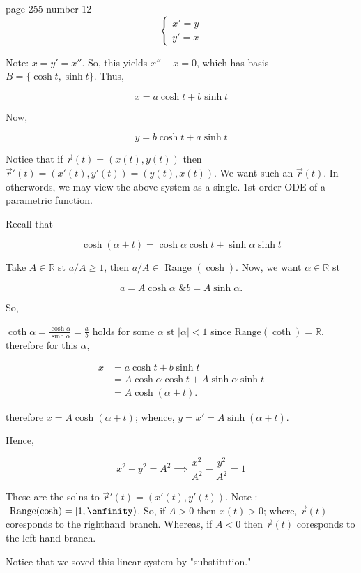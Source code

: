 \begin{example}
  page 255 number 12 \\ 
  
 \[ 
  \begin{cases}
   x' = y  \\
  y' = x 
  \end{cases}
  \]
  
  Note: \( x = y' = x'' \). So, this yields \( x'' - x = 0 \), which has
  basis \( B = \{ \cosh t, \sinh t \} \). Thus, 

  \[ x = a \cosh t + b \sinh t \]

  Now, 

  \[ y =  b \cosh t + a \sinh t\]

  Notice that if \( \vec{r}(t) = (x(t), y(t))  \) then \( \vec{r}'(t) =
  (x'(t), y'(t)) = (y(t), x(t))  \). We want such an \( \vec{r}(t)  \). In otherwords,
  we may view the above system as a single. 1st order ODE of a
  parametric function. 

  Recall that 

  \[ \cosh (\alpha + t) = \cosh \alpha \cosh t + \sinh \alpha \sinh t \]

  Take \( A \in \mathbb{R} \) st \( a/A \geq 1 \), then \( a/A \in \)
  Range \( (\cosh)\). Now, we want \( \alpha \in \mathbb{R} \) st

  \[ a = A \cosh \alpha \text{ \& }  b = A \sinh \alpha.\]

  So, 

  \( \coth \alpha = \frac{ \cosh \alpha}{ \sinh \alpha} = \frac{a}{b} \)
  holds for some \( \alpha \) st \( |\alpha| < 1 \) since \( \text{
  Range} (\coth) = \mathbb{R} \). therefore for this \( \alpha \), 

  \begin{align*}
   x &=  a \cosh t + b \sinh t \\
   &= A \cosh \alpha \cosh t + A \sinh \alpha \sinh t \\
   &= A \cosh (\alpha + t).
  \end{align*}

  therefore \( x = A \cosh (\alpha + t) \); whence, \( y = x' = A \sinh
  (\alpha + t).\)

  Hence, 

  \[ x^2 - y^2 = A^2 \implies \frac{x^2}{A^2} - \frac{y^2}{A^2} = 1 \]

These are the solns to \( \vec{r}'(t) = (x'(t), y'(t)).  \) Note : \(
\text{ Range} (\cosh) = [1,\enfinity)\). So, if \( A > 0 \) then \( x(t)
> 0\); where, \( \vec{r}(t) \) coresponds to the righthand branch.
Whereas, if \( A<0 \) then \( \vec{r}(t) \) coresponds to the left hand
branch. 

Notice that we soved this linear system by "substitution." 

\end{example}

